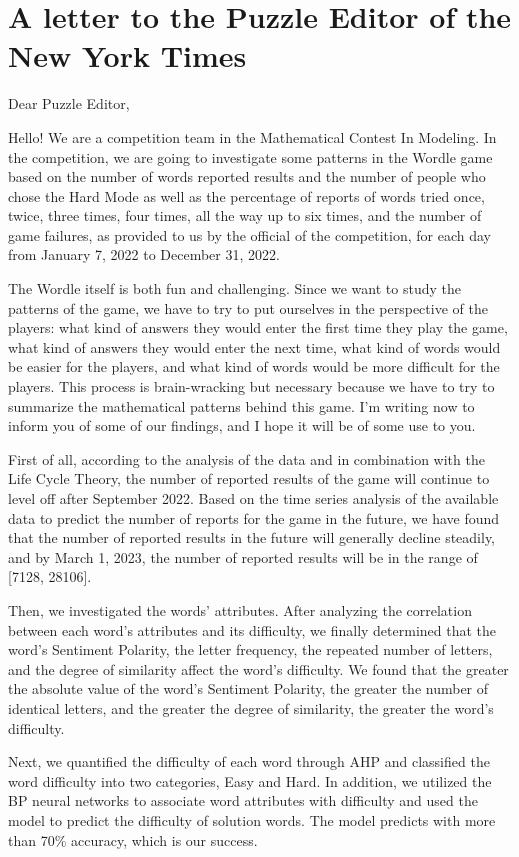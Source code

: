 \documentclass[12pt]{article}  %
\begin{document}
\section{A letter to the Puzzle Editor of the New York Times}
\noindent Dear Puzzle Editor,

Hello! We are a competition team in the Mathematical Contest In Modeling. In the competition, we are going to investigate some patterns in the Wordle game based on the number of words reported results and the number of people who chose the Hard Mode as well as the percentage of reports of words tried once, twice, three times, four times, all the way up to six times, and the number of game failures, as provided to us by the official of the competition, for each day from January 7, 2022 to December 31, 2022.

The Wordle itself is both fun and challenging. Since we want to study the patterns of the game, we have to try to put ourselves in the perspective of the players: what kind of answers they would enter the first time they play the game, what kind of answers they would enter the next time, what kind of words would be easier for the players, and what kind of words would be more difficult for the players. This process is brain-wracking but necessary because we have to try to summarize the mathematical patterns behind this game. I'm writing now to inform you of some of our findings, and I hope it will be of some use to you.

First of all, according to the analysis of the data and in combination with the Life Cycle Theory, the number of reported results of the game will continue to level off after September 2022. Based on the time series analysis of the available data to predict the number of reports for the game in the future, we have found that the number of reported results in the future will generally decline steadily, and by March 1, 2023, the number of reported results will be in the range of [7128, 28106].

Then, we investigated the words' attributes. After analyzing the correlation between each word's attributes and its difficulty, we finally determined that the word's Sentiment Polarity, the letter frequency, the repeated number of letters, and the degree of similarity affect the word's difficulty. We found that the greater the absolute value of the word's Sentiment Polarity, the greater the number of identical letters, and the greater the degree of similarity, the greater the word's difficulty.

Next, we quantified the difficulty of each word through AHP and classified the word difficulty into two categories, Easy and Hard. In addition, we utilized the BP neural networks to associate word attributes with difficulty and used the model to predict the difficulty of solution words. The model predicts with more than 70\% accuracy, which is our success.
\end{document}
